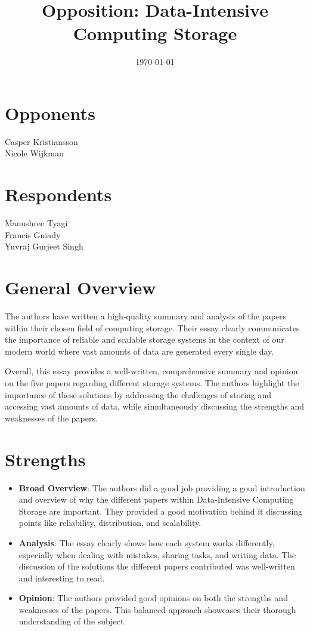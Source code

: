 \documentclass[12pt]{article}
\title{Opposition: Data-Intensive Computing Storage}
\date{\today}
\begin{document}
\maketitle

\noindent
\begin{minipage}{0.5\textwidth}
    \centering
    \section*{Opponents}
    Casper Kristiansson \\
    Nicole Wijkman
\end{minipage}%
\begin{minipage}{0.5\textwidth}
    \centering
    \section*{Respondents}
    Manushree Tyagi \\
    Francis Gniady \\
    Yuvraj Gurjeet Singh
\end{minipage}


\section{General Overview}

The authors have written a high-quality summary and analysis of the papers within their chosen field of computing storage. Their essay clearly communicates the importance of reliable and scalable storage systems in the context of our modern world where vast amounts of data are generated every single day.

Overall, this essay provides a well-written, comprehensive summary and opinion on the five papers regarding different storage systems. The authors highlight the importance of these solutions by addressing the challenges of storing and accessing vast amounts of data, while simultaneously discussing the strengths and weaknesses of the papers.

\section{Strengths}
\begin{itemize}
    \item \textbf{Broad Overview}: The authors did a good job providing a good introduction and overview of why the different papers within Data-Intensive Computing Storage are important. They provided a good motivation behind it discussing points like reliability, distribution, and scalability.
    \item \textbf{Analysis}: The essay clearly shows how each system works differently, especially when dealing with mistakes, sharing tasks, and writing data. The discussion of the solutions the different papers contributed was well-written and interesting to read.
    \item \textbf{Opinion}: The authors provided good opinions on both the strengths and weaknesses of the papers. This balanced approach showcases their thorough understanding of the subject.
\end{itemize}
\end{document}
